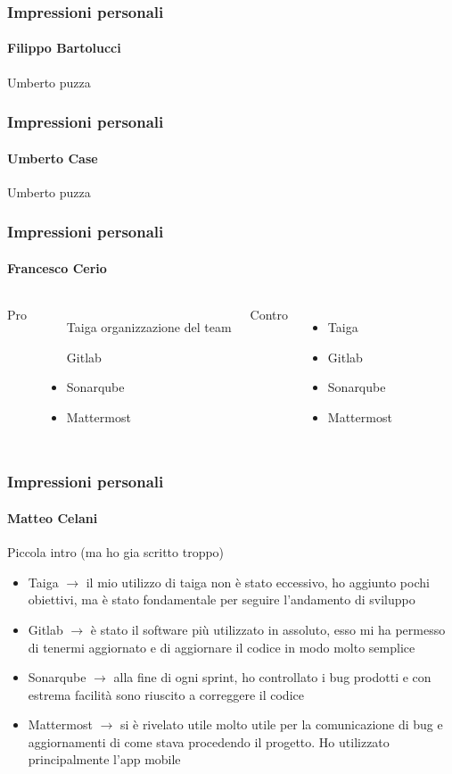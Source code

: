 \documentclass{beamer}
\begin{document}
\begin{frame}
\frametitle{Impressioni personali}
\framesubtitle{Filippo Bartolucci}
Umberto puzza
\end{frame}

\begin{frame}
\frametitle{Impressioni personali}
\framesubtitle{Umberto Case}
Umberto puzza
\end{frame}

\begin{frame}
\frametitle{Impressioni personali}
\framesubtitle{Francesco Cerio}
\begin{columns}
\centering
Pro
\begin{itemize}
	\item[Taiga] organizzazione del team
	\item[Gitlab]	
	\item Sonarqube
	\item Mattermost
  \end{itemize}
\centering
Contro
\begin{itemize}
	\item Taiga
	\item Gitlab	
	\item Sonarqube
	\item Mattermost
  \end{itemize}
  \end{columns}
\end{frame}

\begin{frame}
\frametitle{Impressioni personali}
\framesubtitle{Matteo Celani}
Piccola intro (ma ho gia scritto troppo)
\begin{itemize}
	\item Taiga $\to$ il mio utilizzo di taiga non è stato eccessivo, ho aggiunto pochi obiettivi, ma è stato fondamentale per seguire l'andamento di sviluppo 
	\item Gitlab $\to$ è stato il software più utilizzato in assoluto, esso mi ha permesso di tenermi aggiornato e di aggiornare il codice in modo molto semplice
	\item Sonarqube $\to$ alla fine di ogni sprint, ho controllato i bug prodotti e con estrema facilità sono riuscito a correggere il codice
	\item Mattermost  $\to$ si è rivelato utile molto utile per la comunicazione di bug e aggiornamenti di come stava procedendo il progetto. Ho utilizzato principalmente l'app mobile
  \end{itemize}
\end{frame}
\end{document}
